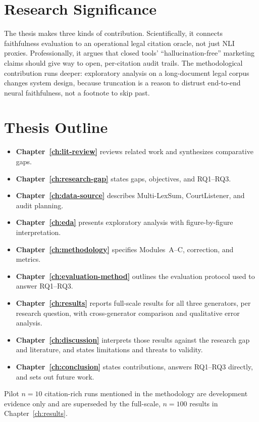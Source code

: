 \section{Research Significance}
\label{sec:intro-significance}

The thesis makes three kinds of contribution. Scientifically, it connects faithfulness evaluation \cite{maynez2020faithfulness,pagnoni2021factuality} to an operational legal citation oracle, not just NLI proxies. Professionally, it argues that closed tools' ``hallucination-free'' marketing claims should give way to open, per-citation audit trails. The methodological contribution runs deeper: exploratory analysis on a long-document legal corpus changes system design, because truncation is a reason to distrust end-to-end neural faithfulness, not a footnote to skip past.

\section{Thesis Outline}
\label{sec:intro-outline}

\begin{itemize}
  \item \textbf{Chapter~\ref{ch:lit-review}} reviews related work and synthesizes comparative gaps.
  \item \textbf{Chapter~\ref{ch:research-gap}} states gaps, objectives, and RQ1--RQ3.
  \item \textbf{Chapter~\ref{ch:data-source}} describes Multi-LexSum, CourtListener, and audit planning.
  \item \textbf{Chapter~\ref{ch:eda}} presents exploratory analysis with figure-by-figure interpretation.
  \item \textbf{Chapter~\ref{ch:methodology}} specifies Modules~A--C, correction, and metrics.
  \item \textbf{Chapter~\ref{ch:evaluation-method}} outlines the evaluation protocol used to answer RQ1--RQ3.
  \item \textbf{Chapter~\ref{ch:results}} reports full-scale results for all three generators, per research question, with cross-generator comparison and qualitative error analysis.
  \item \textbf{Chapter~\ref{ch:discussion}} interprets those results against the research gap and literature, and states limitations and threats to validity.
  \item \textbf{Chapter~\ref{ch:conclusion}} states contributions, answers RQ1--RQ3 directly, and sets out future work.
\end{itemize}
Pilot $n=10$ citation-rich runs mentioned in the methodology are development evidence only and are superseded by the full-scale, $n=100$ results in Chapter~\ref{ch:results}.
